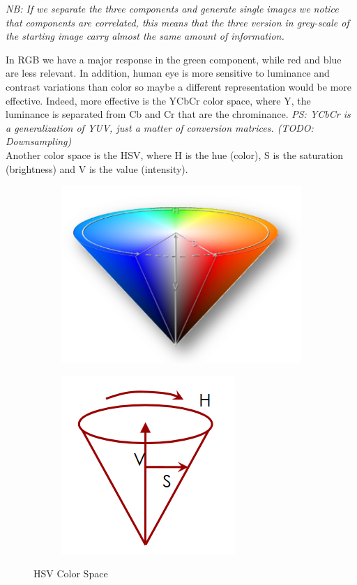 \textit{NB: If we separate the three components and generate single images we notice that components are correlated, this means that the three version in grey-scale of the starting image carry almost the same amount of information.}

In RGB we have a major response in the green component, while red and blue are less relevant. In addition, human eye is more sensitive to luminance and contrast variations than color so maybe a different representation would be more effective.
Indeed, more effective is the YCbCr color space, where Y, the luminance is separated from Cb and Cr that are the chrominance.
\textit{PS: YCbCr is a generalization of YUV, just a matter of conversion matrices. (TODO: Downsampling)}
\\
Another color space is the HSV, where H is the hue (color), S is the saturation (brightness) and V is the value (intensity).

\begin{figure}[h]
    \begin{subfigure}{0.5\textwidth}
        \includegraphics[scale=0.4]{Figures/HSV1.png} 
        \label{fig:subim1}
    \end{subfigure}
    \begin{subfigure}{0.5\textwidth}
        \includegraphics[scale=0.5]{Figures/HSV2.png}
        \label{fig:subim2}
    \end{subfigure}
        
        \caption{HSV Color Space}
        \label{fig:image2}
\end{figure}

